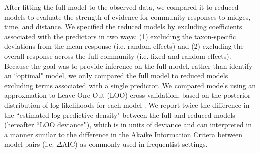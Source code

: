 After fitting the full model to the observed data, we compared it to reduced models
to evaluate the strength of evidence for community responses to midges, time,
and distance.
We specified the reduced models by excluding coefficients associated with the
predictors in two ways: (1) excluding the taxon-specific deviations from the mean
response (i.e. random effects) and (2) excluding the overall response across the
full community (i.e. fixed and random effects).
Because the goal was to provide inference on the full model, rather than identify
an ``optimal" model, we only compared the full model to reduced models
excluding terms associated with a single predictor.
We compared models using an approxmation to Leave-One-Out (LOO) cross validation,
based on the posterior distribution of log-likelihoods for each model
\citep{Vehtari2017}.
We report twice the difference in the ``estimated log predictive density" between
the full and reduced models (hereafter ``LOO deviance"), which is in units of
deviance and can interpreted in a manner similar to the difference in the
Akaike Information Critera between model pairs (i.e. $\Delta$AIC) as
commonly used in frequentist settings.

